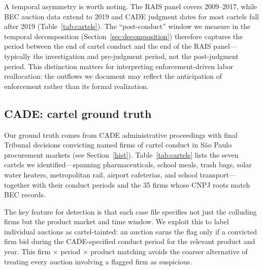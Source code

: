 A temporal asymmetry is worth noting. The RAIS panel covers 2009--2017, while BEC auction data extend to 2019 and CADE judgment dates for most cartels fall after 2019 (Table~\ref{tab:cartels}). The ``post-conduct'' window we measure in the temporal decomposition (Section~\ref{sec:decomposition}) therefore captures the period between the end of cartel conduct and the end of the RAIS panel---typically the investigation and pre-judgment period, not the post-judgment period. This distinction matters for interpreting enforcement-driven labor reallocation: the outflows we document may reflect the anticipation of enforcement rather than its formal realization.

\subsection{CADE: cartel ground truth}

Our ground truth comes from CADE administrative proceedings with final Tribunal decisions convicting named firms of cartel conduct in S\~{a}o Paulo procurement markets (see Section~\ref{hist}). Table~\ref{tab:cartels} lists the seven cartels we identified---spanning pharmaceuticals, school meals, trash bags, solar water heaters, metropolitan rail, airport cafeterias, and school transport---together with their conduct periods and the 35 firms whose CNPJ roots match BEC records.

The key feature for detection is that each case file specifies not just the colluding firms but the product market and time window. We exploit this to label individual auctions as cartel-tainted: an auction earns the flag only if a convicted firm bid during the CADE-specified conduct period for the relevant product and year. This firm $\times$ period $\times$ product matching avoids the coarser alternative of treating every auction involving a flagged firm as suspicious.

